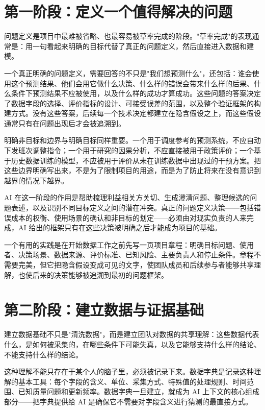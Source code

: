 \section{第一阶段：定义一个值得解决的问题}

问题定义是项目中最难被省略、也最容易被草率完成的阶段。"草率完成"的表现通常是：用一句看起来明确的目标代替了真正的问题定义，然后直接进入数据和建模。

一个真正明确的问题定义，需要回答的不只是"我们想预测什么"，还包括：谁会使用这个预测结果、他们会用它做什么决策、什么样的错误会带来什么样的后果、什么条件下预测结果不应被使用，以及什么样的成功才算成功。这些问题的答案决定了数据字段的选择、评价指标的设计、可接受误差的范围，以及整个验证框架的构建方式。没有这些答案，后续每一个技术决定都建立在隐含假设之上，而这些假设通常只有在问题出现后才会被追溯到。

明确非目标和边界与明确目标同样重要。一个用于调度参考的预测系统，不应自动下发班次调整指令；一个用于研究的因果分析，不应直接被用于政策评价；一个基于历史数据训练的模型，不应被用于评价从未在训练数据中出现过的干预方案。把这些边界明确写出来，不是为了限制项目的用途，而是为了防止将来在没有意识到越界的情况下越界。

AI 在这一阶段的作用是帮助梳理利益相关方关切、生成澄清问题、整理候选的问题表述，以及识别不同目标定义之间的潜在冲突。真正的问题定义决策——包括错误成本的权衡、使用场景的确认和非目标的划定——必须由对现实负责的人来完成，AI 给出的框架只有在这些决策被明确之后才能成为项目的基础。

一个有用的实践是在开始数据工作之前先写一页项目章程：明确目标问题、使用者、决策场景、数据来源、评价标准、已知风险、主要负责人和停止条件。章程不需要完美，但它把隐含假设变成可见的文字，使团队成员和后续参与者能够共享理解，也使后来的决策能够被追溯到最初的问题框架。

\section{第二阶段：建立数据与证据基础}

建立数据基础不只是"清洗数据"，而是建立团队对数据的共享理解：这些数据代表什么，是如何被采集的，在哪些条件下可能失真，以及它能够支持什么样的结论、不能支持什么样的结论。

这种理解不能只存在于某个人的脑子里，必须被记录下来。数据字典是记录这种理解的基本工具：每个字段的含义、单位、采集方式、特殊值的处理规则、时间范围、已知质量问题和更新频率。数据字典一旦建立，就成为 AI 上下文的核心组成部分——把字典提供给 AI 是确保它不需要对字段含义进行猜测的最直接方式。

